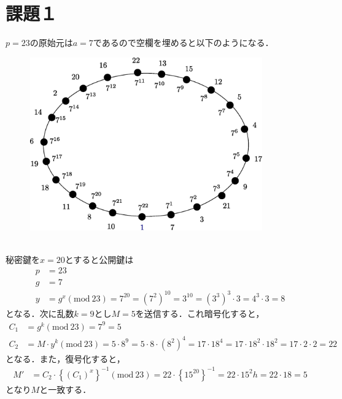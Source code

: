 \documentclass[a4paper,12pt]{jarticle}
\begin{document}
%
\title{\vspace{-30mm} }
\date{}
%
\maketitle
%
\vspace{-30mm}
%
\setlength{\abovedisplayskip}{0pt} %
\setlength{\belowdisplayskip}{0pt} %

\section*{課題１}
\vspace{-4mm}
$p=23$の原始元は$a=7$であるので空欄を埋めると以下のようになる．
%
\begin{figure}[hbp]
 \begin{center}
  \includegraphics[width=100mm]{fig/elga.eps}
 \end{center}
 \label{fig:elga}
\end{figure}
%
\\秘密鍵を$x=20$とすると公開鍵は
%
\begin{align}
 p&=23 \\
 g&=7 \\
 y&=g^x (\mathrm{mod}~23)=7^{20}=(7^2)^{10}=3^{10}=(3^3)^3\cdot3=4^3\cdot3=8
\end{align}
%
となる．次に乱数$k=9$とし$M=5$を送信する．これ暗号化すると，
%
\begin{align}
 C_1&=g^k (\mathrm{mod}~23)=7^9=5\\
 C_2&=M \cdot y^k (\mathrm{mod}~23)=5\cdot8^9=5\cdot8 \cdot(8^2)^4 =17\cdot18^4=17\cdot18^2\cdot18^2 =17\cdot2\cdot2=22 
\end{align}
%
となる．また，復号化すると，
%
\begin{align}
 M'&=C_2\cdot \left\{ (C_1)^x \right\}^{-1} (\mathrm{mod}~23)=22\cdot \left\{15^{20}\right\}^{-1} =22\cdot 15^2 h=22\cdot18=5
\end{align}
%
となり$M$と一致する．
\vspace{-5mm}
\end{document}
